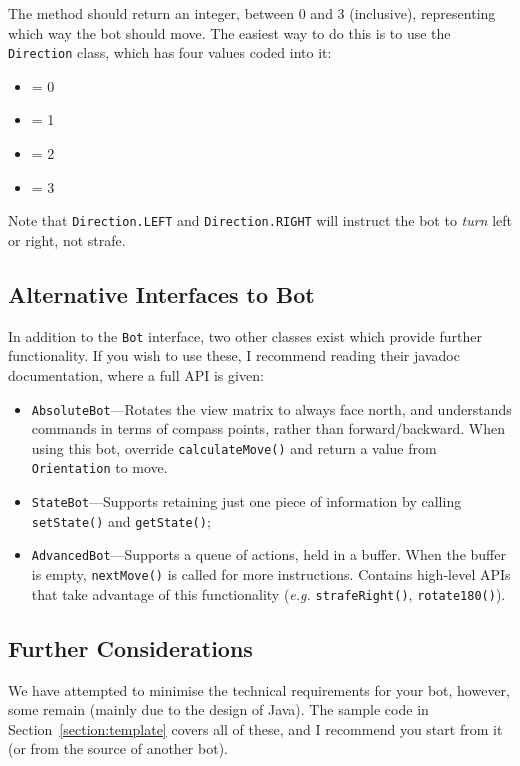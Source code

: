 \documentclass[11pt]{article}
\begin{document}
The method should return an integer, between 0 and 3 (inclusive), representing which way the bot should move.  The easiest way to do this is to use the \texttt{Direction} class, which has four values coded into it:
\begin{itemize}
\item {} = 0
\item {} = 1
\item {} = 2
\item {} = 3
\end{itemize}
Note that \texttt{Direction.LEFT} and \texttt{Direction.RIGHT} will instruct the bot to \textit{turn} left or right, not strafe.



\subsection{Alternative Interfaces to Bot}
\label{section:alternativeapis}
In addition to the \texttt{Bot} interface, two other classes exist which provide further functionality.  If you wish to use these, I recommend reading their javadoc documentation, where a full API is given:
\begin{itemize}
\item \texttt{AbsoluteBot}---Rotates the view matrix to always face north, and understands commands in terms of compass points, rather than forward/backward.  When using this bot, override \texttt{calculateMove()} and return a value from \texttt{Orientation} to move.
\item \texttt{StateBot}---Supports retaining just one piece of information by calling \texttt{setState()} and \texttt{getState()};
\item \texttt{AdvancedBot}---Supports a queue of actions, held in a buffer.  When the buffer is empty, \texttt{nextMove()} is called for more instructions.  Contains high-level APIs that take advantage of this functionality (\textsl{e.g.} \texttt{strafeRight()}, \texttt{rotate180()}).
\end{itemize}


\subsection{Further Considerations}
We have attempted to minimise the technical requirements for your bot, however, some remain (mainly due to the design of Java).  The sample code in Section~\ref{section:template} covers all of these, and I recommend you start from it (or from the source of another bot).
\end{document}
